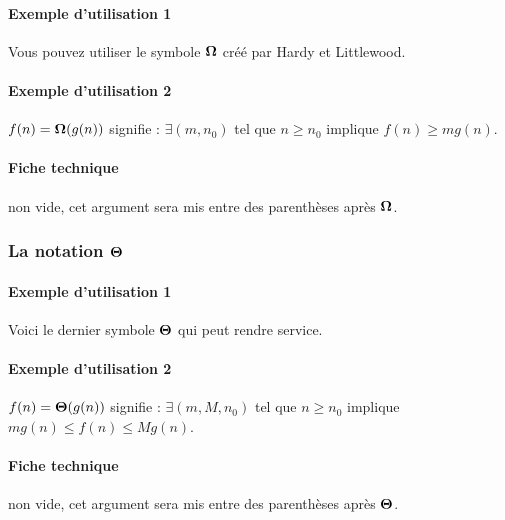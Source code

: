 \documentclass[12pt,a4paper]{article}
\begin{document}
\paragraph{Exemple d'utilisation 1}

\begin{tcblisting}{}
Vous pouvez utiliser le symbole $\bigomega{}$ créé par Hardy et Littlewood.
\end{tcblisting}


\paragraph{Exemple d'utilisation 2}

\begin{tcblisting}{}
$f(n) = \bigomega{g(n)}$ signifie :
$\exists (m, n_0)$ tel que $n \geqslant n_0$ implique $f(n) \geqslant m g(n)$.
\end{tcblisting}


\paragraph{Fiche technique}


\IDarg{} non vide, cet argument sera mis entre des parenthèses après $\bigomega{}$.



\subsubsection{\texorpdfstring{La notation $\bigtheta{}$}%
                               {La notation "grand Theta"}}

\paragraph{Exemple d'utilisation 1}

\begin{tcblisting}{}
Voici le dernier symbole $\bigtheta{}$ qui peut rendre service.
\end{tcblisting}


\paragraph{Exemple d'utilisation 2}

\begin{tcblisting}{}
$f(n) = \bigtheta{g(n)}$ signifie : $\exists (m, M, n_0)$ tel que $n \geqslant n_0$
implique $m g(n) \leqslant f(n) \leqslant M g(n)$.
\end{tcblisting}


\paragraph{Fiche technique}


\IDarg{} non vide, cet argument sera mis entre des parenthèses après $\bigtheta{}$.
\end{document}
